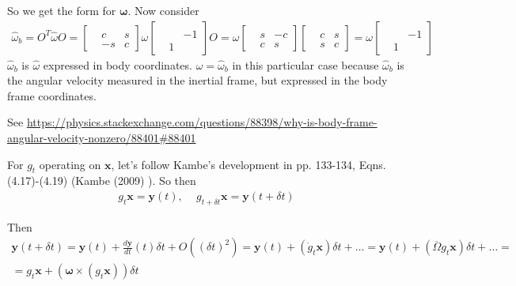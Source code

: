 So we get the form for $\mathbf{\omega}$. Now consider
\[
\begin{gathered}
\widehat{\omega}_b = O^T \widehat{\omega} O = \left[ \begin{matrix} & & \\ & c & s \\ & -s & c \end{matrix} \right] \omega \left[ \begin{matrix} & & \\ & & -1 \\ & 1 & \end{matrix} \right] O = \omega \left[ \begin{matrix} & & \\ & s & -c \\ & c & s \end{matrix} \right] \left[ \begin{matrix} & & \\ & c & s \\ & s & c \end{matrix} \right] = \omega \left[ \begin{matrix} & & \\ & & -1 \\ & 1 & \end{matrix} \right]	
\end{gathered}
\]
$\widehat{\omega}_b$ is $\widehat{\omega}$ expressed in body coordinates. $\widehat{\omega} = \widehat{\omega}_b$ in this particular case because $\widehat{\omega}_b$ is the angular velocity measured in the inertial frame, but expressed in the body frame coordinates.

See \url{https://physics.stackexchange.com/questions/88398/why-is-body-frame-angular-velocity-nonzero/88401#88401}



For $g_t$ operating on $\mathbf{x}$, let's follow Kambe's development in pp. 133-134, Eqns. (4.17)-(4.19) (Kambe (2009) \cite{dgdt:TKambe2009}). So then
\[
\begin{gathered}
g_t \mathbf{x} = \mathbf{y}(t), \quad \, g_{t+\delta t} \mathbf{x} = \mathbf{y}(t+\delta t)
\end{gathered}
\]

Then
\[
\begin{gathered}
\mathbf{y}(t+ \delta t) = \mathbf{y}(t) + \frac{d\mathbf{y} }{dt} (t) \delta t + O( (\delta t)^2 ) = \mathbf{y}(t) + (\dot{g}_t \mathbf{x} ) \delta t + \dots = \mathbf{y}(t) + (\overline{\Omega} g_t \mathbf{x}) \delta t + \dots = \\
 = g_t \mathbf{x} + ( \mathbf{\omega} \times (g_t \mathbf{x} ) ) \delta t
\end{gathered}
\]

